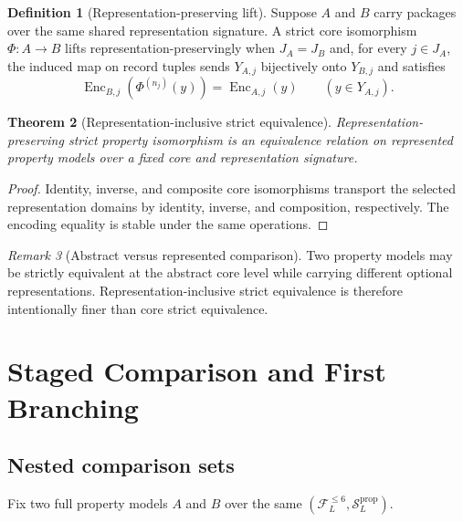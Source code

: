 \documentclass[11pt]{article}
\newcommand{\FVI}{\mathcal F_{L}^{\le 6}}
\newcommand{\Sprop}{\mathcal S_{L}^{\mathrm{prop}}}
\newcommand{\Enc}{\operatorname{Enc}}
\newtheorem{theorem}{Theorem}[section]
\theoremstyle{definition}
\newtheorem{definition}[theorem]{Definition}
\theoremstyle{remark}
\newtheorem{remark}[theorem]{Remark}
\begin{document}
\begin{definition}[Representation-preserving lift]
Suppose \(A\) and \(B\) carry packages over the same shared representation signature.
A strict core isomorphism \(\Phi:A\to B\) lifts representation-preservingly when \(J_A=J_B\) and, for every \(j\in J_A\), the induced map on record tuples sends \(Y_{A,j}\) bijectively onto \(Y_{B,j}\) and satisfies
\[
\Enc_{B,j}(\Phi^{(n_j)}(y))=\Enc_{A,j}(y)
\qquad
(y\in Y_{A,j}).
\]
\end{definition}

\begin{theorem}[Representation-inclusive strict equivalence]
Representation-preserving strict property isomorphism is an equivalence relation on represented property models over a fixed core and representation signature.
\end{theorem}

\begin{proof}
Identity, inverse, and composite core isomorphisms transport the selected representation domains by identity, inverse, and composition, respectively.
The encoding equality is stable under the same operations.
\end{proof}

\begin{remark}[Abstract versus represented comparison]
Two property models may be strictly equivalent at the abstract core level while carrying different optional representations.
Representation-inclusive strict equivalence is therefore intentionally finer than core strict equivalence.
\end{remark}

\section{Staged Comparison and First Branching}
\label{sec:branching}

\subsection{Nested comparison sets}

Fix two full property models \(A\) and \(B\) over the same \((\FVI,\Sprop)\).
\end{document}
